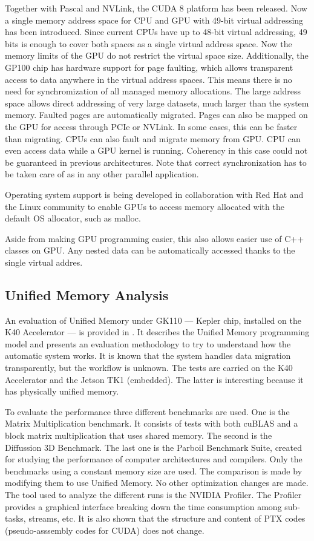 Together with Pascal and NVLink, the CUDA 8 platform has been released.
Now a single memory address space for CPU and GPU with 49-bit virtual addressing has been introduced.
Since current CPUs have up to 48-bit virtual addressing, 49 bits is enough to cover both spaces as a single virtual address space.
Now the memory limits of the GPU do not restrict the virtual space size.
Additionally, the GP100 chip has hardware support for page faulting, which allows transparent access to data anywhere in the virtual address spaces.
This means there is no need for synchromization of all managed memory allocations.
The large address space allows direct addressing of very large datasets, much larger than the system memory.
Faulted pages are automatically migrated.
Pages can also be mapped on the GPU for access through PCIe or NVLink.
In some cases, this can be faster than migrating.
CPUs can also fault and migrate memory from GPU.
CPU can even access data while a GPU kernel is running.
Coherency in this case could not be guaranteed in previous architectures.
Note that correct synchronization has to be taken care of as in any other parallel application.

Operating system support is being developed in collaboration with Red Hat and the Linux community to enable GPUs to access memory allocated with the default OS allocator, such as malloc.

Aside from making GPU programming easier, this also allows easier use of C++ classes on GPU.
Any nested data can be automatically accessed thanks to the single virtual addres.

\subsection{Unified Memory Analysis \cite{li2015evaluation}} \label{subsec:unifmemanaly}
An evaluation of Unified Memory under GK110 --- Kepler chip, installed on the K40 Accelerator --- is provided in \cite{li2015evaluation}.
It describes the Unified Memory programming model and presents an evaluation methodology to try to understand how the automatic system works.
It is known that the system handles data migration transparently, but the workflow is unknown.
The tests are carried on the K40 Accelerator and the Jetson TK1 (embedded).
The latter is interesting because it has physically unified memory.

To evaluate the performance three different benchmarks are used.
One is the Matrix Multiplication benchmark.
It consists of tests with both cuBLAS and a block matrix multiplication that uses shared memory.
The second is the Diffussion 3D Benchmark.
The last one is the Parboil Benchmark Suite, created for studying the performance of computer architectures and compilers.
Only the benchmarks using a constant memory size are used.
The comparison is made by modifying them to use Unified Memory.
No other optimization changes are made.
The tool used to analyze the different runs is the NVIDIA Profiler.
The Profiler provides a graphical interface breaking down the time consumption among sub-tasks, streams, etc.
It is also shown that the structure and content of PTX codes (pseudo-asssembly codes for CUDA) does not change.

